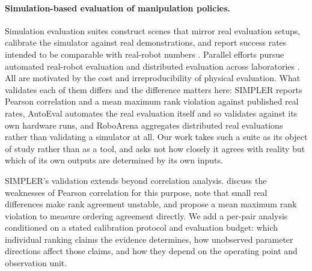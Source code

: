 \documentclass[pdflatex,iicol,sn-apa]{sn-jnl}
\theoremstyle{remark}
\begin{document}
\paragraph{Simulation-based evaluation of manipulation policies.}
Simulation evaluation suites construct scenes that mirror real evaluation setups, calibrate
the simulator against real demonstrations, and report success rates intended to be comparable with
real-robot numbers \citep{li2024simpler}. Parallel efforts pursue automated real-robot evaluation
\citep{zhou2025autoeval} and distributed evaluation across laboratories
\citep{atreya2025roboarena}. All are motivated by the cost and irreproducibility of physical
evaluation. What validates each of them differs and the difference matters here: SIMPLER reports
Pearson correlation and a mean maximum rank violation against published real rates, AutoEval automates
the real evaluation itself and so validates against its own hardware runs, and RoboArena aggregates
distributed real evaluations rather than validating a simulator at all. Our work takes such a suite as its
object of study rather than as a tool, and asks not how closely it agrees with reality but which of
its own outputs are determined by its own inputs.

SIMPLER's validation extends beyond correlation analysis. \citet{li2024simpler} discuss the
weaknesses of Pearson correlation for this purpose, note that small real differences make rank
agreement unstable, and propose a mean maximum rank violation to measure ordering agreement
directly. We add a per-pair analysis conditioned on a stated calibration protocol and evaluation
budget: which individual ranking claims the evidence determines, how unobserved parameter
directions affect those claims, and how they depend on the operating point and observation unit.
\end{document}
